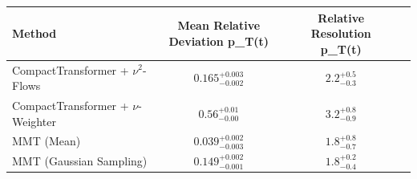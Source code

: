     \begin{tabular}{lccc}
        \toprule
        Method & Mean Relative Deviation p_{T}(t) & Relative Resolution p_{T}(t) \\
        \midrule
        CompactTransformer + $\nu^2$-Flows & $0.165_{-0.002}^{+0.003}$ & $2.2_{-0.3}^{+0.5}$ \\
        CompactTransformer + $\nu$-Weighter & $0.56_{-0.00}^{+0.01}$ & $3.2_{-0.9}^{+0.8}$ \\
        MMT (Mean) & $0.039_{-0.003}^{+0.002}$ & $1.8_{-0.7}^{+0.8}$ \\
        MMT (Gaussian Sampling) & $0.149_{-0.001}^{+0.002}$ & $1.8_{-0.4}^{+0.2}$ \\
        \bottomrule
    \end{tabular}